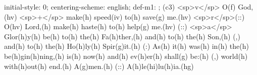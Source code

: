 initial-style: 0;
centering-scheme: english;
def-m1: \grealign;
(c3) <sp>v</sp> O(f) God,(hv) <sp>+</sp> make(h) speed(iv) to(h) save(g) me.(hv) <sp>r</sp>(::) O(hv) Lord,(h) make(h) haste(h) to(h) help(g) me.(hv) (::) <sp>a</sp> Glor(h)y(h) be(h) to(h) the(h) Fa(h)ther,(h) and(h) to(h) the(h) Son,(h) (,) and(h) to(h) the(h) Ho(h)ly(h) Spir(g)it.(h) (:) As(h) it(h) was(h) in(h) the(h) be(h)gin(h)ning,(h) is(h) now(h) and(h) ev(h)er(h) shall(g) be:(h) (,) world(h) with(h)out(h) end.(h) A(g)men.(h) (::) A(h)le(hi)lu(h)ia.(hg)